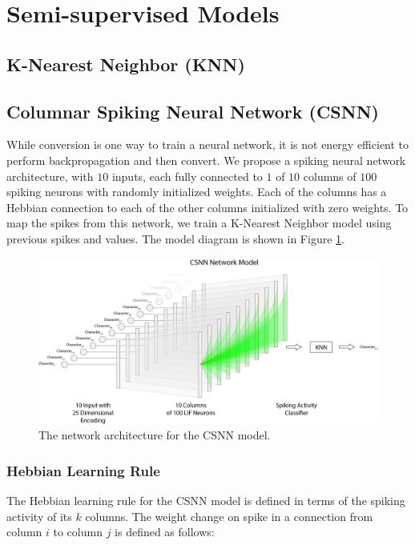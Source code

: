 \documentclass{article}
\begin{document}
\section*{Semi-supervised Models}

\subsection*{K-Nearest Neighbor (KNN)}

\subsection*{Columnar Spiking Neural Network (CSNN)}

While conversion is one way to train a neural network, it is not energy efficient to perform backpropagation and then convert. We propose a spiking neural network architecture, with $10$ inputs, each fully connected to $1$ of $10$ columns of $100$ spiking neurons with randomly initialized weights. Each of the columns has a Hebbian connection to each of the other columns initialized with zero weights. To map the spikes from this network, we train a K-Nearest Neighbor model using previous spikes and values. \cite{beliaev2007time} The model diagram is shown in Figure \ref{fig:csnn-network-diagram}.

\begin{figure}[H]
    \centering
    \includegraphics[width=0.9\linewidth]{../diagrams/csnn.png}
    \caption{The network architecture for the CSNN model.}
    \label{fig:csnn-network-diagram}
\end{figure}

\subsubsection*{Hebbian Learning Rule}
The Hebbian learning rule for the CSNN model is defined in terms of the spiking activity of its $k$ columns. The weight change on spike in a connection from column $i$ to column $j$ is defined as follows:
\end{document}
